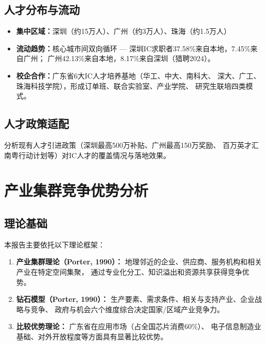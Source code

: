 \documentclass[12pt,a4paper]{ctexart}
\begin{document}
\subsection{人才分布与流动}
\label{sec:talent_flow}

\begin{itemize}
    \item \textbf{集中区域：}深圳（约15万人）、广州（约3万人）、珠海（约1.5万人）
    \item \textbf{流动趋势：}核心城市间双向循环 —
          深圳IC求职者37.58\%来自本地，7.45\%来自广州；
          广州42.13\%来自本地，8.17\%来自深圳（猎聘2024）。
    \item \textbf{校企合作：}广东省6大IC人才培养基地（华工、中大、南科大、
          深大、广工、珠海科技学院），形成订单班、联合实验室、产业学院、
          研究生联培四类模式。
\end{itemize}

\subsection{人才政策适配}
\label{sec:talent_policy}

分析现有人才引进政策（深圳最高500万补贴、广州最高150万奖励、
百万英才汇南粤行动计划等）对IC人才的覆盖情况与落地效果。

\section{产业集群竞争优势分析}
\label{sec:cluster}

\subsection{理论基础}
\label{sec:theory}

本报告主要依托以下理论框架：
\begin{enumerate}[label=(\arabic*)]
    \item \textbf{产业集群理论（Porter, 1990）：}
          地理邻近的企业、供应商、服务机构和相关产业在特定空间集聚，
          通过专业化分工、知识溢出和资源共享获得竞争优势。
    \item \textbf{钻石模型（Porter, 1990）：}
          生产要素、需求条件、相关与支持产业、企业战略与竞争、
          政府与机会六个维度综合决定国家/区域产业竞争力。
    \item \textbf{比较优势理论：}
          广东省在应用市场（占全国芯片消费60\%）、
          电子信息制造业基础、对外开放程度等方面具有显著比较优势。
\end{enumerate}
\end{document}
